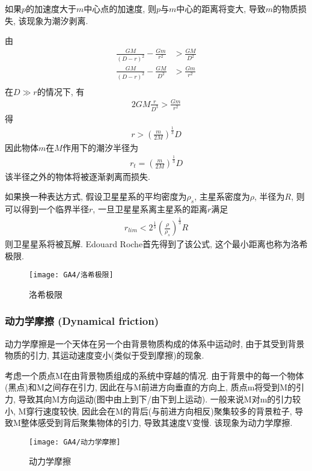 如果$p$的加速度大于$m$中心点的加速度, 则$p$与$m$中心的距离将变大, 导致$m$的物质损失, 该现象为潮汐剥离. 

由
\begin{align*}
    \frac{GM}{(D-r)^2}-\frac{Gm}{r^2}&>\frac{GM}{D^2}\\
    \frac{GM}{(D-r)^2}-\frac{GM}{D^2}&>\frac{Gm}{r^2}\\
\end{align*}
在$D\gg r$的情况下, 有
\begin{align*}
    2GM\frac{r}{D^3}>\frac{Gm}{r^2}
\end{align*}
得
\begin{align*}
    r>\left( \frac{m}{2M} \right)^{\frac{1}{3}}D
\end{align*}
因此物体$m$在$M$作用下的潮汐半径为
\begin{align*}
    r_t=\left( \frac{m}{2M} \right)^{\frac{1}{3}}D
\end{align*}
该半径之外的物体将被逐渐剥离而损失. 

如果换一种表达方式, 假设卫星星系的平均密度为$\rho_s$, 主星系密度为$\rho$, 半径为$R$, 则可以得到一个临界半径$r$, 一旦卫星星系离主星系的距离$r$满足
\begin{align*}
    r_{lim}<2^{\frac{1}{3}}\left( \frac{\rho}{\rho_s} \right)^{\frac{1}{3}}R
\end{align*}
则卫星星系将被瓦解. Edouard Roche首先得到了该公式, 这个最小距离也称为\textcolor{light_red}{洛希极限}. 

\begin{figure}[!htb]
    \centering
    \texttt{[image: GA4/洛希极限]}
    \caption{洛希极限}
\end{figure}

\subsubsection{动力学摩擦 (Dynamical friction)}
动力学摩擦是一个天体在另一个由背景物质构成的体系中运动时, 由于其受到背景物质的引力, 其运动速度变小(类似于受到摩擦)的现象. 

考虑一个质点M在由背景物质组成的系统中穿越的情况. 由于背景中的每一个物体(黑点)和M之间存在引力, 因此在与M前进方向垂直的方向上, 质点m将受到M的引力, 导致其向M方向运动(图中由上到下/由下到上运动). 一般来说M对m的引力较小, M穿行速度较快, 因此会在M的背后(与前进方向相反)聚集较多的背景粒子, 导致M整体感受到背后聚集物体的引力, 导致其速度V变慢. 该现象为动力学摩擦. 

\begin{figure}[!htb]
    \centering
    \texttt{[image: GA4/动力学摩擦]}
    \caption{动力学摩擦}
\end{figure}

